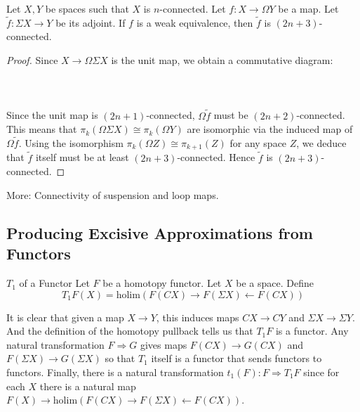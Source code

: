 \documentclass[a4paper]{article}
\begin{document}
\begin{crl}{}{} Let $X,Y$ be spaces such that $X$ is $n$-connected. Let $f:X\to\Omega Y$ be a map. Let $\widetilde{f}:\Sigma X\to Y$ be its adjoint. If $f$ is a weak equivalence, then $\widetilde{f}$ is $(2n+3)$-connected. \tcbline
\begin{proof}
Since $X\to\Omega\Sigma X$ is the unit map, we obtain a commutative diagram: \\~\\
\\~\\
Since the unit map is $(2n+1)$-connected, $\Omega\widetilde{f}$ must be $(2n+2)$-connected. This means that $\pi_k(\Omega\Sigma X)\cong\pi_k(\Omega Y)$ are isomorphic via the induced map of $\Omega\widetilde{f}$. Using the isomorphism $\pi_k(\Omega Z)\cong\pi_{k+1}(Z)$ for any space $Z$, we deduce that $\widetilde{f}$ itself must be at least $(2n+3)$-connected. Hence $\widetilde{f}$ is $(2n+3)$-connected. 
\end{proof}
\end{crl}

More: Connectivity of suspension and loop maps. 

\subsection{Producing Excisive Approximations from Functors}
\begin{defn}{$T_1$ of a Functor}{} Let $F$ be a homotopy functor. Let $X$ be a space.  Define $$T_1F(X)=\text{holim}(F(CX)\rightarrow F(\Sigma X)\leftarrow F(CX))$$
\end{defn}

It is clear that given a map $X\to Y$, this induces maps $CX\to CY$ and $\Sigma X\to\Sigma Y$. And the definition of the homotopy pullback tells us that $T_1F$ is a functor. Any natural transformation $F\Rightarrow G$ gives maps $F(CX)\to G(CX)$ and $F(\Sigma X)\to G(\Sigma X)$ so that $T_1$ itself is a functor that sends functors to functors. Finally, there is a natural transformation $t_1(F):F\Rightarrow T_1F$ since for each $X$ there is a natural map $F(X)\to\text{holim}(F(CX)\rightarrow F(\Sigma X)\leftarrow F(CX))$. 
\end{document}
